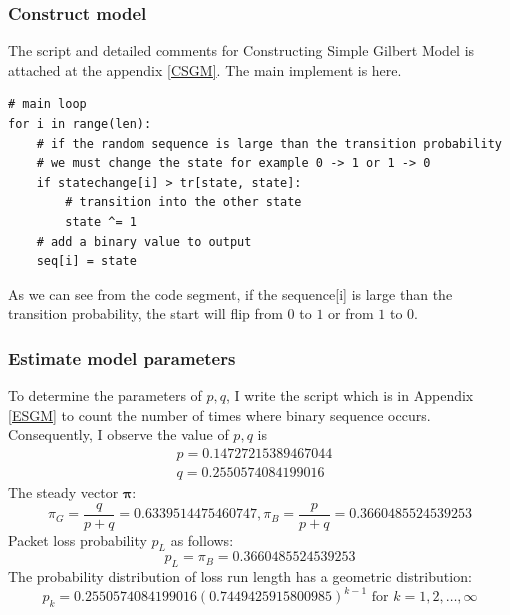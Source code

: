 \documentclass[11pt]{article}
\begin{document}
\subsubsection{Construct model}
The script and detailed comments for Constructing Simple Gilbert Model is attached at the appendix \ref{CSGM}.
The main implement is here.
\begin{verbatim}
# main loop
for i in range(len):
    # if the random sequence is large than the transition probability
    # we must change the state for example 0 -> 1 or 1 -> 0
    if statechange[i] > tr[state, state]:
        # transition into the other state
        state ^= 1
    # add a binary value to output
    seq[i] = state
\end{verbatim}
As we can see from the code segment, if the sequence[i] is large than the transition probability, the start will flip from $0$ to $1$ or from $1$ to $0$.
\subsubsection{Estimate model parameters}
To determine the parameters of $p,q$, I write the script which is in Appendix \ref{ESGM} to count the number of times where binary sequence occurs.
Consequently, I observe the value of $p,q$ is 
\begin{equation}
    \begin{array}{lr}
    p = 0.14727215389467044 & \\
    q = 0.2550574084199016
    \end{array}
\end{equation}
The steady vector $\boldsymbol{\pi}$:
\begin{equation}
    \pi_G = \frac{q}{p+q} = 0.6339514475460747, \pi_B = \frac{p}{p+q} = 0.3660485524539253
\end{equation}
Packet loss probability $p_L$ as follows:
\begin{equation}
    p_L = \pi_B = 0.3660485524539253
\end{equation}
The probability distribution of loss run length has a geometric distribution:
\begin{equation}
    p_{k} =0.2550574084199016(0.7449425915800985)^{k-1} \text { for } k=1,2, \ldots, \infty \label{distributionofSGM}
\end{equation}
\end{document}
